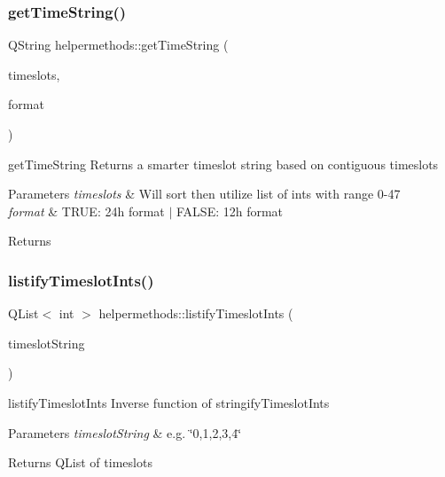 \subsubsection{\texorpdfstring{get\+Time\+String()}{getTimeString()}}
{\footnotesize\ttfamily Q\+String helpermethods\+::get\+Time\+String (\begin{DoxyParamCaption}\item[{Q\+List$<$ int $>$}]{timeslots,  }\item[{bool}]{format }\end{DoxyParamCaption})\hspace{0.3cm}{\ttfamily [static]}}



get\+Time\+String Returns a smarter timeslot string based on contiguous timeslots 


\begin{DoxyParams}{Parameters}
{\em timeslots} & Will sort then utilize list of ints with range 0-\/47 \\
\hline
{\em format} & T\+R\+UE\+: 24h format $\vert$ F\+A\+L\+SE\+: 12h format \\
\hline
\end{DoxyParams}
\begin{DoxyReturn}{Returns}

\end{DoxyReturn}
\mbox{\label{classhelpermethods_ab2c39e2fbd1d97104b57f8f5cbf2c3ab}} 
\subsubsection{\texorpdfstring{listify\+Timeslot\+Ints()}{listifyTimeslotInts()}}
{\footnotesize\ttfamily Q\+List$<$ int $>$ helpermethods\+::listify\+Timeslot\+Ints (\begin{DoxyParamCaption}\item[{Q\+String}]{timeslot\+String }\end{DoxyParamCaption})\hspace{0.3cm}{\ttfamily [static]}}



listify\+Timeslot\+Ints Inverse function of stringify\+Timeslot\+Ints 


\begin{DoxyParams}{Parameters}
{\em timeslot\+String} & e.\+g. \char`\"{}0,1,2,3,4\char`\"{} \\
\hline
\end{DoxyParams}
\begin{DoxyReturn}{Returns}
Q\+List of timeslots 
\end{DoxyReturn}
\mbox{\label{classhelpermethods_aa6324bf2fa835db5e8baacc6500e0447}} 
